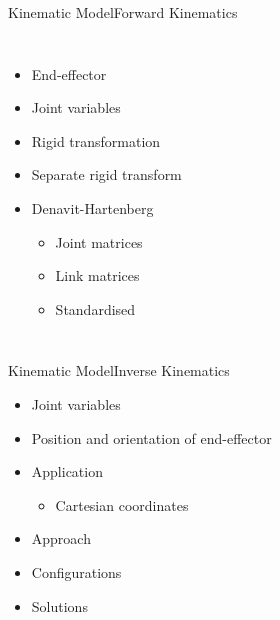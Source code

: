 \begin{frame}{Kinematic Model}{Forward Kinematics}
\begin{columns}
\begin{itemize}
    \item End-effector
    \item Joint variables
    \item Rigid transformation
    \item Separate rigid transform
    \item Denavit-Hartenberg
    \begin{itemize}
        \item Joint matrices
        \item Link matrices
        \item Standardised
    \end{itemize}
\end{itemize}
\end{columns}
\end{frame}


\begin{frame}{Kinematic Model}{Inverse Kinematics}
\begin{itemize}
    \item Joint variables
    \item Position and orientation of end-effector
    \item Application
    \begin{itemize}
        \item Cartesian coordinates
    \end{itemize}
    \item Approach 
    \item Configurations
    \item Solutions
\end{itemize}
\end{frame}

